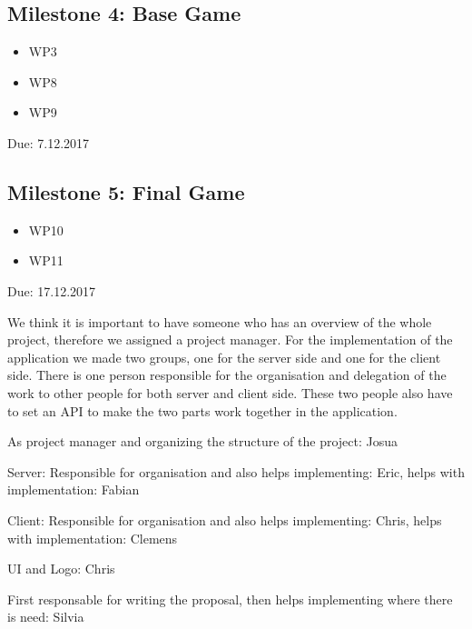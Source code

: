 \documentclass{sig-alternate}
\begin{document}
\subsection{Milestone 4: Base Game}
\begin{itemize}
	\item WP3
	\item WP8
	\item WP9
\end{itemize}
Due: 7.12.2017

\subsection{Milestone 5: Final Game}
\begin{itemize}
	\item WP10
	\item WP11
\end{itemize}
Due: 17.12.2017

We think it is important to have someone who has an overview of the whole project, therefore we assigned a project manager. For the implementation of the application we made two groups, one for the server side and one for the client side. There is one person responsible for the organisation and delegation of the work to other people for both server and client side. These two people also have to set an API to make the two parts work together in the application.

As project manager and organizing the structure of the project: Josua

Server: Responsible for organisation and also helps implementing: Eric, helps with implementation: Fabian

Client: Responsible for organisation and also helps implementing: Chris, helps with implementation: Clemens

UI and Logo: Chris

First responsable for writing the proposal, then helps implementing where there is need: Silvia




\end{document}
